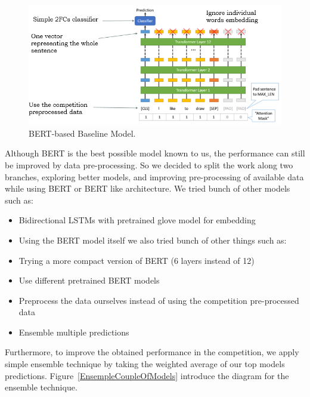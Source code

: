 \documentclass[10pt,twocolumn,letterpaper]{article}
\begin{document}
\begin{figure}[htbp]
\centerline{\includegraphics[width=0.999\columnwidth]{Figures/BERTbasedModel.png}}
\caption{BERT-based Baseline Model.}
\label{BERTbasedModel}
\end{figure}

Although BERT is the best possible model known to us, the performance can still be improved by data pre-processing.
So we decided to split the work along two branches, exploring better models, and improving pre-processing of available data while using BERT or BERT like architecture.
We tried bunch of other models such as:
\begin{itemize}
\item Bidirectional LSTMs with pretrained glove model for embedding
\item Using the BERT model itself we also tried bunch of other things such as:
\item Trying a more compact version of BERT (6 layers instead of 12) 
\item Use different pretrained BERT models 
\item Preprocess the data ourselves instead of using the competition pre-processed data
\item Ensemble multiple predictions
\end{itemize}

Furthermore, to improve the obtained performance in the competition, we apply simple ensemble technique by taking the weighted average of our top models predictions. Figure~\ref{EnsempleCoupleOfModels} introduce the diagram for the ensemble technique.   
\end{document}

